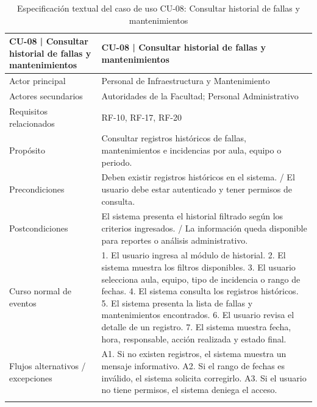 \begingroup
\small
\begin{longtable}{|p{7.8cm}|p{7.8cm}|}
\hline
CU-08 | Consultar historial de fallas y mantenimientos & CU-08 | Consultar historial de fallas y mantenimientos \\ \hline
Actor principal & Personal de Infraestructura y Mantenimiento \\ \hline
Actores secundarios & Autoridades de la Facultad; Personal Administrativo \\ \hline
Requisitos relacionados & RF-10, RF-17, RF-20 \\ \hline
Propósito & Consultar registros históricos de fallas, mantenimientos e incidencias por aula, equipo o periodo. \\ \hline
Precondiciones & Deben existir registros históricos en el sistema. / El usuario debe estar autenticado y tener permisos de consulta. \\ \hline
Postcondiciones & El sistema presenta el historial filtrado según los criterios ingresados. / La información queda disponible para reportes o análisis administrativo. \\ \hline
Curso normal de eventos & 1. El usuario ingresa al módulo de historial. 2. El sistema muestra los filtros disponibles. 3. El usuario selecciona aula, equipo, tipo de incidencia o rango de fechas. 4. El sistema consulta los registros históricos. 5. El sistema presenta la lista de fallas y mantenimientos encontrados. 6. El usuario revisa el detalle de un registro. 7. El sistema muestra fecha, hora, responsable, acción realizada y estado final. \\ \hline
Flujos alternativos / excepciones & A1. Si no existen registros, el sistema muestra un mensaje informativo. A2. Si el rango de fechas es inválido, el sistema solicita corregirlo. A3. Si el usuario no tiene permisos, el sistema deniega el acceso. \\ \hline
\caption{Especificación textual del caso de uso CU-08: Consultar historial de fallas y mantenimientos}
\end{longtable}
\endgroup

